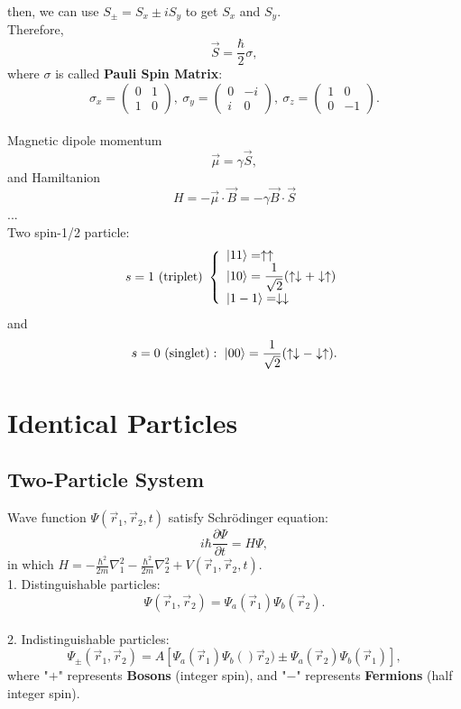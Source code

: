 \documentclass[12pt, 
]{article}
\begin{document}
then, we can use $S_\pm=S_x\pm iS_y$ to get $S_x$ and $S_y$.\\
Therefore, $$\vec{S}=\frac{\hbar}{2}\sigma,$$where $\sigma$ is called {\bf Pauli Spin Matrix}:
\[
	\sigma_x= \begin{pmatrix}
		0&1\\1&0
	\end{pmatrix},~\sigma_y= \begin{pmatrix}
		0&-i\\i&0
	\end{pmatrix},~\sigma_z= \begin{pmatrix}
		1&0\\0&-1
	\end{pmatrix}.
\]
~\\
Magnetic dipole momentum 
\[
	\vec{\mu}=\gamma\vec{S},
\]
and Hamiltanion 
\[
	H=-\vec{\mu}\cdot\vec{B}=-\gamma\vec{B}\cdot\vec{S}
\]
...\\
Two spin-1/2 particle:
\[
	s=1~({\rm triplet})~\left\{
	\begin{array}{l}
		\ket{11}=\uparrow\uparrow\\
		\ket{10}=\dfrac{1}{\sqrt{2}}(\uparrow\downarrow+\downarrow\uparrow)\\
		\ket{1-1}=\downarrow\downarrow
	\end{array}\right.
\]
and
\[
	s=0~(\rm singlet):~\ket{00}=\frac{1}{\sqrt{2}}(\uparrow\downarrow-\downarrow\uparrow).
\]
\newpage
\section{Identical Particles}
\subsection{Two-Particle System}
Wave function $\varPsi(\vec{r}_1,\vec{r}_2,t)$ satisfy Schr\"odinger equation:
\[
	i\hbar\frac{\partial\varPsi}{\partial t}=H\varPsi,
\]
in which $\displaystyle H=-\frac{\hbar^2}{2m}\nabla^2_1-\frac{\hbar^2}{2m}\nabla_2^2+V(\vec{r}_1,\vec{r}_2,t).$\\
1. Distinguishable particles:
\[
	\varPsi(\vec{r}_1,\vec{r}_2)=\varPsi_a(\vec{r}_1)\varPsi_b(\vec{r}_2).
\]\\
2. Indistinguishable particles:
\[
	\varPsi_\pm(\vec{r}_1,\vec{r}_2)=A[\varPsi_a(\vec{r}_1)\varPsi_b()\vec{r}_2)\pm\varPsi_a(\vec{r}_2)\varPsi_b(\vec{r}_1)],
\]
where "$+$" represents {\bf Bosons} (integer spin), and "$-$" represents {\bf Fermions} (half integer spin).\\
\end{document}

